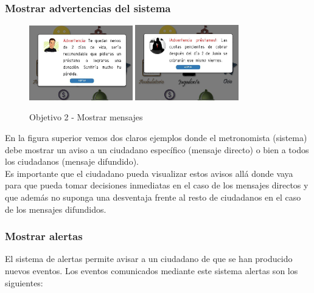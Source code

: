 \subsubsection{Mostrar advertencias del sistema}
\begin{figure}[ht]
  \centering
    \includegraphics[width=0.4\textwidth]{imagenes/Objetivo2.png}
    \includegraphics[width=0.4\textwidth]{imagenes/Objetivo2b.png}
    \caption{Objetivo 2 - Mostrar mensajes}
    \label{objetivoIm2}
\end{figure}

En la figura superior vemos dos claros ejemplos donde el metronomista (sistema) debe mostrar un aviso a un ciudadano específico (mensaje directo) o bien a todos los ciudadanos (mensaje difundido).\\

Es importante que el ciudadano pueda visualizar estos avisos allá donde vaya para que pueda tomar decisiones inmediatas en el caso de los mensajes directos y que además no suponga una desventaja frente al resto de ciudadanos en el caso de los mensajes difundidos.

\subsubsection{Mostrar alertas}

El sistema de alertas permite avisar a un ciudadano de que se han producido nuevos eventos. Los eventos comunicados mediante este sistema alertas son los siguientes:\\

